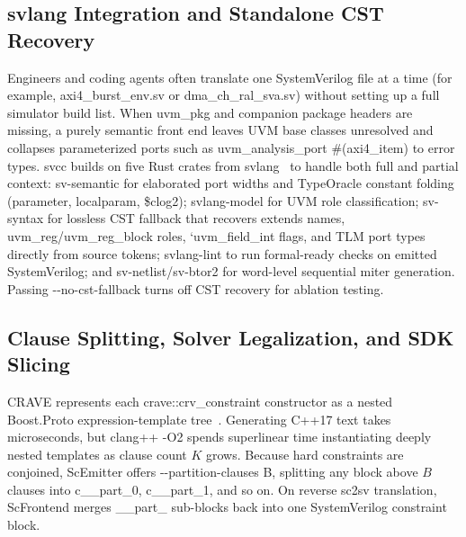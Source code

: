 \documentclass[conference]{IEEEtran}
\newcommand{\code}[1]{{\fontshape{n}\ttfamily #1}}
\begin{document}
\subsection{svlang Integration and Standalone CST Recovery}
Engineers and coding agents often translate one SystemVerilog file at a time (for example, \code{axi4\_burst\_env.sv} or \code{dma\_ch\_ral\_sva.sv}) without setting up a full simulator build list. When \code{uvm\_pkg} and companion package headers are missing, a purely semantic front end leaves UVM base classes unresolved and collapses parameterized ports such as \code{uvm\_analysis\_port \#(axi4\_item)} to error types. \code{svcc} builds on five Rust crates from \code{svlang}~\cite{kubavat2026svlang} to handle both full and partial context: \code{sv-semantic} for elaborated port widths and \code{TypeOracle} constant folding (\code{parameter}, \code{localparam}, \code{\$clog2}); \code{svlang-model} for UVM role classification; \code{sv-syntax} for lossless CST fallback that recovers \code{extends} names, \code{uvm\_reg}/\code{uvm\_reg\_block} roles, \code{`uvm\_field\_int} flags, and TLM port types directly from source tokens; \code{svlang-lint} to run \code{formal-ready} checks on emitted SystemVerilog; and \code{sv-netlist}/\code{sv-btor2} for word-level sequential miter generation. Passing \code{-{}-no-cst-fallback} turns off CST recovery for ablation testing.

\subsection{Clause Splitting, Solver Legalization, and SDK Slicing}
CRAVE represents each \code{crave::\allowbreak crv\_\allowbreak constraint} constructor as a nested Boost.Proto expression-template tree~\cite{haedicke2012crave,veldhuizen1995expr}. Generating C++17 text takes microseconds, but \code{clang++ -O2} spends superlinear time instantiating deeply nested templates as clause count $K$ grows. Because hard constraints are conjoined, \code{ScEmitter} offers \code{-{}-partition-clauses B}, splitting any block above $B$ clauses into \code{c\_\_part\_0}, \code{c\_\_part\_1}, and so on. On reverse \code{sc2sv} translation, \code{ScFrontend} merges \code{\_\_part\_} sub-blocks back into one SystemVerilog \code{constraint} block.
\end{document}
